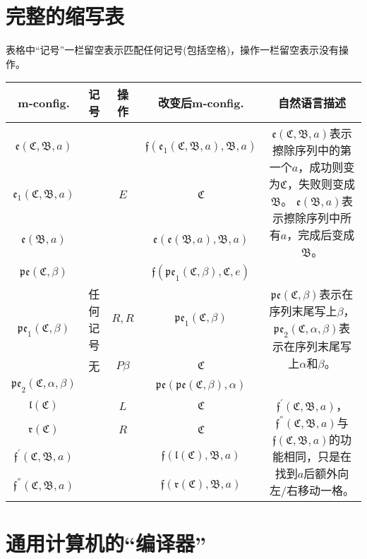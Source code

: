 \documentclass[8pt]{article}
\begin{document}
\begin{appendices}
\section{完整的缩写表}\label{abbr_table}
表格中“记号”一栏留空表示匹配任何记号(包括空格)，操作一栏留空表示没有操作。
\begin{table}[h]
	\centering
	\begin{tabular}{cccc|c}
		m-config. & 记号 & 操作 & 改变后m-config. & 自然语言描述\\
		\hline
		$\mathfrak{e}(\mathfrak C, \mathfrak B, a)$ & & & $\mathfrak f(\mathfrak e_1(\mathfrak C, \mathfrak B, a), \mathfrak B, a)$ & \multirow{3}{180}{$\mathfrak{e}(\mathfrak C, \mathfrak B, a)$表示擦除序列中的第一个$a$，成功则变为$\mathfrak C$，失败则变成$\mathfrak B$。 $\mathfrak e(\mathfrak B, a)$表示擦除序列中所有$a$，完成后变成$\mathfrak B$。}\\
		$\mathfrak e_1(\mathfrak C, \mathfrak B, a)$ & & $E$ & $\mathfrak C$ & \\
		$\mathfrak e(\mathfrak B, a)$ & & & $\mathfrak e(\mathfrak e(\mathfrak B, a), \mathfrak B, a)$ & \\
		\hline
		
		
		$\mathfrak{pe}(\mathfrak C, \beta)$ & & & $\mathfrak f(\mathfrak{pe}_1(\mathfrak C, \beta), \mathfrak C, e)$ & \multirow{4}{180}{$\mathfrak{pe}(\mathfrak C, \beta)$表示在序列末尾写上$\beta$，$\mathfrak{pe}_2(\mathfrak {C}, \alpha, \beta)$表示在序列末尾写上$\alpha$和$\beta$。}\\
		\multirow{2}{*}{$\mathfrak{pe}_1(\mathfrak C, \beta)$} & 任何记号 & $R, R$ & $\mathfrak{pe}_1(\mathfrak C, \beta)$ & \\
		& 无 & $P\beta$ & $\mathfrak C$ &\\
		$\mathfrak{pe}_2(\mathfrak C, \alpha, \beta)$ & & & $\mathfrak{pe}(\mathfrak{pe}(\mathfrak C, \beta), \alpha)$ &\\
		\hline
		$\mathfrak l(\mathfrak C)$ & & $L$ & $\mathfrak C$ & \multirow{4}{180}{
		$\mathfrak {f}^{'}(\mathfrak C, \mathfrak B, a)$，$\mathfrak {f}^{''}(\mathfrak C, \mathfrak B, a)$与$\mathfrak {f}(\mathfrak C, \mathfrak B, a)$的功能相同，只是在找到$a$后额外向左/右移动一格。}\\
		$\mathfrak r(\mathfrak C)$ & & $R$ & $\mathfrak C$ &\\
		$\mathfrak {f}^{'}(\mathfrak C, \mathfrak B, a)$ & & & $\mathfrak f(\mathfrak l(\mathfrak C), \mathfrak B, a)$ & \\
		$\mathfrak {f}^{''}(\mathfrak C, \mathfrak B, a)$ & & & $\mathfrak f(\mathfrak r(\mathfrak C), \mathfrak B, a)$ & \\
	\end{tabular}
\end{table}


\section{通用计算机的“编译器”}\label{compile}
\end{appendices}

\fi
	
\end{document}
